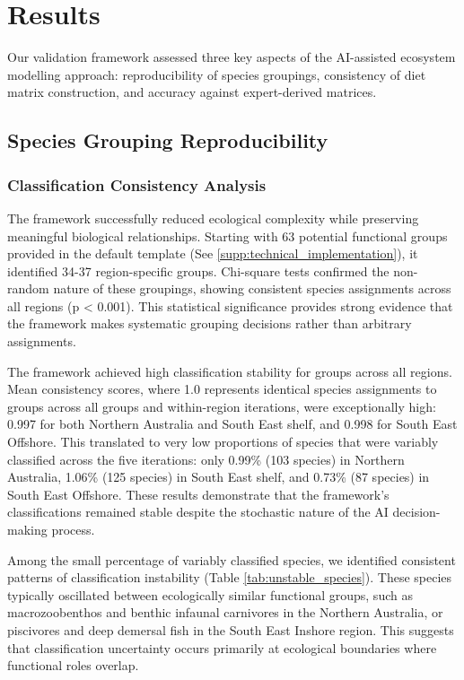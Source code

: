 \section{Results}

Our validation framework assessed three key aspects of the AI-assisted ecosystem modelling approach: reproducibility of species groupings, consistency of diet matrix construction, and accuracy against expert-derived matrices. 

\subsection{Species Grouping Reproducibility}

\subsubsection{Classification Consistency Analysis}
The framework successfully reduced ecological complexity while preserving meaningful biological relationships. Starting with 63 potential functional groups provided in the default template (See \ref{supp:technical_implementation}), it identified 34-37 region-specific groups. Chi-square tests confirmed the non-random nature of these groupings, showing consistent species assignments across all regions (p < 0.001). This statistical significance provides strong evidence that the framework makes systematic grouping decisions rather than arbitrary assignments.

The framework achieved high classification stability for groups across all regions. Mean consistency scores, where 1.0 represents identical species assignments to groups across all groups and within-region iterations, were exceptionally high: 0.997 for both Northern Australia and South East shelf, and 0.998 for South East Offshore. This translated to very low proportions of species that were variably classified across the five iterations: only 0.99\% (103 species) in Northern Australia, 1.06\% (125 species) in South East shelf, and 0.73\% (87 species) in South East Offshore. These results demonstrate that the framework's classifications remained stable despite the stochastic nature of the AI decision-making process.

Among the small percentage of variably classified species, we identified consistent patterns of classification instability (Table \ref{tab:unstable_species}). These species typically oscillated between ecologically similar functional groups, such as macrozoobenthos and benthic infaunal carnivores in the Northern Australia, or piscivores and deep demersal fish in the South East Inshore region. This suggests that classification uncertainty occurs primarily at ecological boundaries where functional roles overlap.

